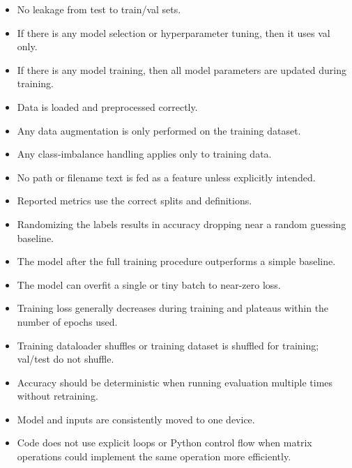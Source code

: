 \documentclass[11pt]{article}
\begin{document}
{\setlength{\itemsep}{0.2em}
\begin{itemize}
  \item No leakage from test to train/val sets.
  \item If there is any model selection or hyperparameter tuning, then it uses val only.
  \item If there is any model training, then all model parameters are updated during training.
  \item Data is loaded and preprocessed correctly.
  \item Any data augmentation is only performed on the training dataset.
  \item Any class-imbalance handling applies only to training data.
  \item No path or filename text is fed as a feature unless explicitly intended.
  \item Reported metrics use the correct splits and definitions.
  \item Randomizing the labels results in accuracy dropping near a random guessing baseline.
  \item The model after the full training procedure outperforms a simple baseline.
  \item The model can overfit a single or tiny batch to near-zero loss.
  \item Training loss generally decreases during training and plateaus within the number of epochs used.
  \item Training dataloader shuffles or training dataset is shuffled for training; val/test do not shuffle.
  \item Accuracy should be deterministic when running evaluation multiple times without retraining.
  \item Model and inputs are consistently moved to one device.
  \item Code does not use explicit loops or Python control flow when matrix operations could implement the same operation more efficiently.
\end{itemize}}
\end{document}
